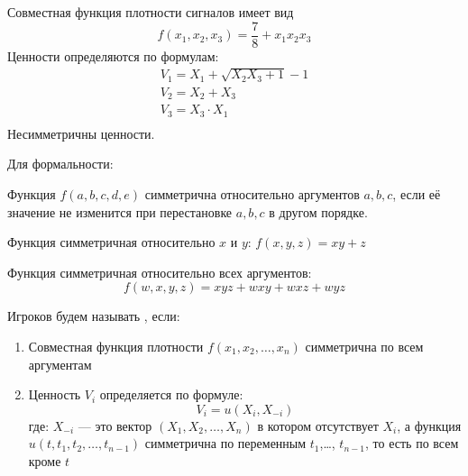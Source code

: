\begin{myex} Совместная функция плотности сигналов имеет вид
\begin{equation}
f(x_{1},x_{2},x_{3})=\frac{7}{8}+x_{1}x_{2}x_{3}
\end{equation}
Ценности определяются по формулам:
\begin{equation}
\begin{array}{c}
V_{1}=X_{1}+\sqrt{X_{2}X_{3}+1}-1 \\
V_{2}=X_{2}+X_{3} \\
V_{3}=X_{3}\cdot X_{1} \\
\end{array}
\end{equation}
Несимметричны ценности.
\end{myex}

Для формальности:
\begin{mydef}
Функция $ f(a,b,c,d,e) $ симметрична относительно аргументов $ a,b,c $, если её значение не изменится при перестановке $ a,b,c $ в другом порядке.
\end{mydef}

\begin{myex} Функция симметричная относительно $ x $ и $ y $: $ f(x,y,z)=xy+z $
\end{myex}

\begin{myex} Функция симметричная относительно всех аргументов:
$$ f(w,x,y,z)=xyz+wxy+wxz+wyz $$
\end{myex}


\begin{mydef} Игроков будем называть , если:
\begin{enumerate}
\item Совместная функция плотности $ f(x_{1},x_{2},\ldots,x_{n}) $ симметрична по всем аргументам
\item Ценность $V_{i}$ определяется по формуле:
\begin{equation}
V_{i}=u(X_{i},X_{-i})
\end{equation}
где: $X_{-i}  $ — это вектор $ (X_{1},X_{2},\ldots,X_{n}) $ в котором отсутствует $ X_{i} $, а  функция $ u(t,t_{1},t_{2},\ldots,t_{n-1}) $ симметрична по переменным $ t_{1} $,\ldots, $ t_{n-1} $, то есть по всем кроме $ t $

\end{enumerate}
\end{mydef}

